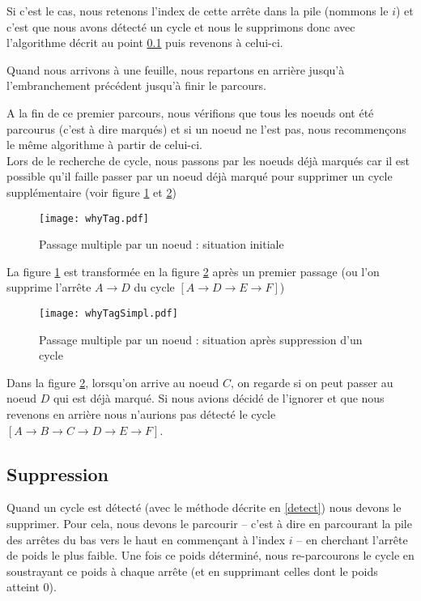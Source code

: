 \documentclass[12pt, oneside]{article}
\begin{document}
Si c'est le cas, nous retenons l'index de cette arrête dans la pile (nommons le $i$) et c'est que nous avons détecté un cycle et nous le supprimons donc avec l'algorithme décrit au point \ref{del} puis revenons à celui-ci.

Quand nous arrivons à une feuille, nous repartons en arrière jusqu'à l'embranchement précédent jusqu'à finir le parcours.

A la fin de ce premier parcours, nous vérifions que tous les noeuds ont été parcourus (c'est à dire marqués) et si un noeud ne l'est pas, nous recommençons le même algorithme à partir de celui-ci.\\

Lors de le recherche de cycle, nous passons par les noeuds déjà marqués car il est possible qu'il faille passer par un noeud déjà marqué pour supprimer un cycle supplémentaire (voir figure \ref{whyTag} et \ref{whyTagSimpl})


\begin{figure}[h]
   \caption{\label{whyTag} Passage multiple par un noeud : situation initiale}
   \center
   \texttt{[image: whyTag.pdf]}
\end{figure}

La figure \ref{whyTag} est transformée en la figure \ref{whyTagSimpl} après un premier passage
(ou l'on supprime l'arrête $A \rightarrow D$ du cycle $[A \rightarrow D \rightarrow E \rightarrow F]$)

\begin{figure}[h]
   \caption{\label{whyTagSimpl} Passage multiple par un noeud : situation après suppression d'un cycle}
   \center
   \texttt{[image: whyTagSimpl.pdf]}

\end{figure}


Dans la figure \ref{whyTagSimpl}, lorsqu'on arrive au noeud $C$, on regarde si on peut passer au noeud $D$ qui est déjà marqué. Si nous avions décidé de l'ignorer et que nous revenons en arrière nous n'aurions pas détecté le cycle $[A \rightarrow B \rightarrow C \rightarrow D \rightarrow E \rightarrow F]$.

\subsection{Suppression}
\label{del}

Quand un cycle est détecté (avec le méthode décrite en \ref{detect}) nous devons le supprimer. Pour cela, nous devons le parcourir -- c'est à dire en parcourant la pile des arrêtes du bas vers le haut en commençant à l'index $i$ -- en cherchant l'arrête de poids le plus faible. Une fois ce poids déterminé, nous re-parcourons le cycle en soustrayant ce poids à chaque arrête (et en supprimant celles dont le poids atteint 0).
\end{document}
